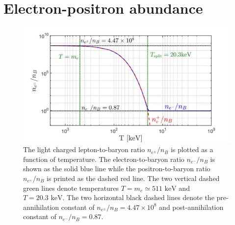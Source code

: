 \documentclass[a4paper]{article}
\newcommand*{\keV}{\text{ keV}}
\begin{document}
\section{Electron-positron abundance}
\label{sec:abundance}
\begin{figure}[ht]
    \centering
    \includegraphics[width=\textwidth]{EEPlasmaDensityRatio.jpg}
    \caption{The light charged lepton-to-baryon ratio $n_{e^{\pm}}/n_{B}$ is plotted as a function of temperature. The electron-to-baryon ratio $n_{e^{-}}/n_{B}$ is shown as the solid blue line while the positron-to-baryon ratio $n_{e^{+}}/n_{B}$ is printed as the dashed red line. The two vertical dashed green lines denote temperatures $T=m_{e}\simeq511\keV$ and $T=20.3\keV$. The two horizontal black dashed lines denote the pre-annihilation constant of $n_{e^{\pm}}/n_{B}=4.47\times10^{8}$ and post-annihilation constant of $n_{e^{-}}/n_{B}=0.87$.}
    \label{densityratio} 
\end{figure}
\end{document}
